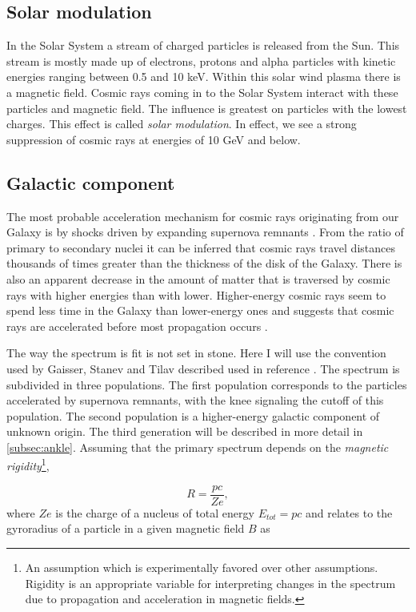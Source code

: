 \subsection{Solar modulation}
In the Solar System a stream of charged particles is released from the Sun. This stream is mostly made up of electrons, protons and alpha particles with kinetic energies ranging between 0.5 and 10 keV. Within this solar wind plasma there is a magnetic field. Cosmic rays coming in to the Solar System interact with these particles and magnetic field. The influence is greatest on particles with the lowest charges. This effect is called \textit{solar modulation}. In effect, we see a strong suppression of cosmic rays at energies of 10 GeV and below.

\subsection{Galactic component}
The most probable acceleration mechanism for cosmic rays originating from our Galaxy is by shocks driven by expanding supernova remnants \cite{0034-4885-64-4-201}. From the ratio of primary to secondary nuclei it can be inferred that cosmic rays travel distances thousands of times greater than the thickness of the disk of the Galaxy. There is also an apparent decrease in the amount of matter that is traversed by cosmic rays with higher energies than with lower. Higher-energy cosmic rays seem to spend less time in the Galaxy than lower-energy ones and suggests that cosmic rays are accelerated before most propagation occurs \cite{Gaisser:2016uoy}.

The way the spectrum is fit is not set in stone. Here I will use the convention used by Gaisser, Stanev and Tilav described used in reference \cite{Gaisser:2013bla}. The spectrum is subdivided in three populations. The first population corresponds to the particles accelerated by supernova remnants, with the knee signaling the cutoff of this population. The second population is a higher-energy galactic component of unknown origin. The third generation will be described in more detail in \ref{subsec:ankle}. Assuming that the primary spectrum depends on the \textit{magnetic rigidity}\footnote{An assumption which is experimentally favored over other assumptions. Rigidity is an appropriate variable for interpreting changes in the spectrum due to propagation and acceleration in magnetic fields.},

\begin{equation}
R = \frac{pc}{Ze},
\end{equation}
where $Ze$ is the charge of a nucleus of total energy $E_{tot} = pc$ and relates to the gyroradius of a particle in a given magnetic field $B$ as

